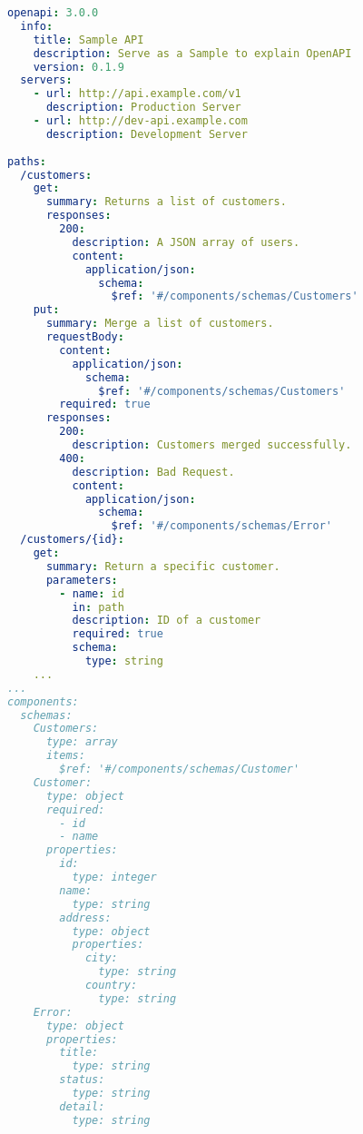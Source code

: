 \begin{lstlisting}[language=yaml, caption=Example OpenAPI Document, captionpos=b, label=lst:SampleOpenAPI]
openapi: 3.0.0
  info:
    title: Sample API
    description: Serve as a Sample to explain OpenAPI
    version: 0.1.9
  servers:
    - url: http://api.example.com/v1
      description: Production Server
    - url: http://dev-api.example.com
      description: Development Server
	
paths:
  /customers:
    get:
      summary: Returns a list of customers.
      responses:
        200:
          description: A JSON array of users.
          content:
            application/json:
              schema:
                $ref: '#/components/schemas/Customers'
    put:
      summary: Merge a list of customers.
      requestBody:
        content:
          application/json:
            schema:
              $ref: '#/components/schemas/Customers'
        required: true
      responses:
        200:
          description: Customers merged successfully.
        400:
          description: Bad Request.
          content:
            application/json:
              schema:
                $ref: '#/components/schemas/Error'
  /customers/{id}:
    get:
      summary: Return a specific customer.
      parameters:
        - name: id
          in: path
          description: ID of a customer
          required: true
          schema:
            type: string
    ...
...
components:
  schemas:
    Customers:
      type: array
      items:
        $ref: '#/components/schemas/Customer'
    Customer:
      type: object
      required:
        - id
        - name
      properties:
        id:
          type: integer
        name:
          type: string
        address:
          type: object
          properties:
            city:
              type: string
            country:
              type: string
    Error:
      type: object
      properties:
        title:
          type: string
        status:
          type: string
        detail:
          type: string
\end{lstlisting}


